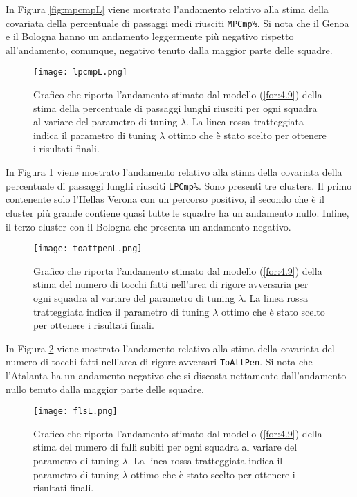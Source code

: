 In Figura \ref{fig:mpcmpL} viene mostrato l'andamento relativo alla stima della covariata della percentuale di passaggi medi riusciti \texttt{MPCmp\%}. Si nota che il Genoa e il Bologna hanno un andamento leggermente più negativo rispetto all’andamento, comunque, negativo tenuto dalla maggior parte delle squadre.

\begin{figure}[htbp]
	\begin{center}
		\texttt{[image: lpcmpL.png]}
		\caption{Grafico che riporta l'andamento stimato dal modello (\ref{for:4.9}) della stima della percentuale di passaggi lunghi riusciti per ogni squadra al variare del parametro di tuning $\lambda$. La linea rossa tratteggiata indica il parametro di tuning $\lambda$ ottimo che è stato scelto per ottenere i risultati finali.} \label{fig:lpcmpL}
	\end{center}
\end{figure}

In Figura \ref{fig:lpcmpL} viene mostrato l'andamento relativo alla stima della covariata della percentuale di passaggi lunghi riusciti \texttt{LPCmp\%}. Sono presenti tre clusters. Il primo contenente solo l'Hellas Verona con un percorso positivo, il secondo che è il cluster più grande contiene quasi tutte le squadre ha un andamento nullo. Infine, il terzo cluster con il Bologna che presenta un andamento negativo.

\begin{figure}[htbp]
	\begin{center}
		\texttt{[image: toattpenL.png]}
		\caption{Grafico che riporta l'andamento stimato dal modello (\ref{for:4.9}) della stima del numero di tocchi fatti nell'area di rigore avversaria per ogni squadra al variare del parametro di tuning $\lambda$. La linea rossa tratteggiata indica il parametro di tuning $\lambda$ ottimo che è stato scelto per ottenere i risultati finali.} \label{fig:toattpenL}
	\end{center}
\end{figure}

In Figura \ref{fig:toattpenL} viene mostrato l'andamento relativo alla stima della covariata del numero di tocchi fatti nell'area di rigore avversari \texttt{ToAttPen}. Si nota che l'Atalanta ha un andamento negativo che si discosta nettamente dall'andamento nullo tenuto dalla maggior parte delle squadre.

\begin{figure}[htbp]
	\begin{center}
		\texttt{[image: flsL.png]}
		\caption{Grafico che riporta l'andamento stimato dal modello (\ref{for:4.9}) della stima del numero di falli subiti per ogni squadra al variare del parametro di tuning $\lambda$. La linea rossa tratteggiata indica il parametro di tuning $\lambda$ ottimo che è stato scelto per ottenere i risultati finali.} \label{fig:flsL}
	\end{center}
\end{figure}

